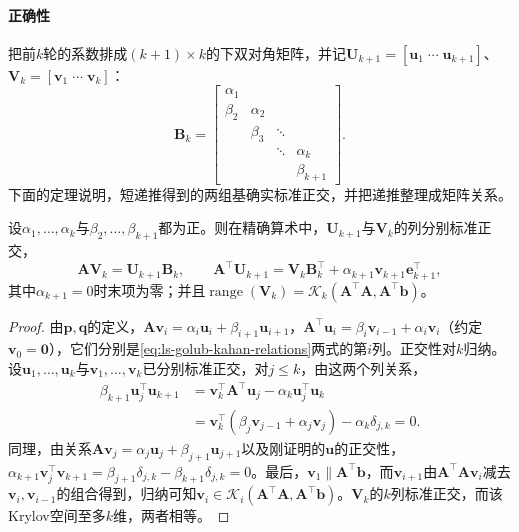 \paragraph{正确性}
把前$k$轮的系数排成$(k+1)\times k$的下双对角矩阵，并记$\bm U_{k+1}=[\bm u_1\;\cdots\;\bm u_{k+1}]$、$\bm V_k=[\bm v_1\;\cdots\;\bm v_k]$：
\[
 \bm B_k=
 \begin{bmatrix}
 \alpha_1&&&\\
 \beta_2&\alpha_2&&\\
 &\beta_3&\ddots&\\
 &&\ddots&\alpha_k\\
 &&&\beta_{k+1}
 \end{bmatrix}.
\]
下面的定理说明，短递推得到的两组基确实标准正交，并把递推整理成矩阵关系。

\begin{theorem}
\label{thm:ls-golub-kahan-relations}
设$\alpha_1,\ldots,\alpha_k$与$\beta_2,\ldots,\beta_{k+1}$都为正。则在精确算术中，$\bm U_{k+1}$与$\bm V_k$的列分别标准正交，
\begin{equation}
 \bm A\bm V_k=\bm U_{k+1}\bm B_k,\qquad
 \bm A^\top\bm U_{k+1}=\bm V_k\bm B_k^\top+\alpha_{k+1}\bm v_{k+1}\bm e_{k+1}^\top,
 \label{eq:ls-golub-kahan-relations}
\end{equation}
其中$\alpha_{k+1}=0$时末项为零；并且$\operatorname{range}(\bm V_k)=\mathcal K_k(\bm A^\top\bm A,\bm A^\top\bm b)$。
\end{theorem}

\begin{proof}
由$\bm p,\bm q$的定义，$\bm A\bm v_i=\alpha_i\bm u_i+\beta_{i+1}\bm u_{i+1}$，$\bm A^\top\bm u_i=\beta_i\bm v_{i-1}+\alpha_i\bm v_i$（约定$\bm v_0=\bm0$），它们分别是\eqref{eq:ls-golub-kahan-relations}两式的第$i$列。正交性对$k$归纳。设$\bm u_1,\ldots,\bm u_k$与$\bm v_1,\ldots,\bm v_k$已分别标准正交，对$j\le k$，由这两个列关系，
\[
 \begin{aligned}
 \beta_{k+1}\bm u_j^\top\bm u_{k+1}
 &=\bm v_k^\top\bm A^\top\bm u_j-\alpha_k\bm u_j^\top\bm u_k\\
 &=\bm v_k^\top(\beta_j\bm v_{j-1}+\alpha_j\bm v_j)-\alpha_k\delta_{j,k}=0 .
 \end{aligned}
\]
同理，由关系$\bm A\bm v_j=\alpha_j\bm u_j+\beta_{j+1}\bm u_{j+1}$以及刚证明的$\bm u$的正交性，$\alpha_{k+1}\bm v_j^\top\bm v_{k+1}=\beta_{j+1}\delta_{j,k}-\beta_{k+1}\delta_{j,k}=0$。最后，$\bm v_1\parallel\bm A^\top\bm b$，而$\bm v_{i+1}$由$\bm A^\top\bm A\bm v_i$减去$\bm v_i,\bm v_{i-1}$的组合得到，归纳可知$\bm v_i\in\mathcal K_i(\bm A^\top\bm A,\bm A^\top\bm b)$。$\bm V_k$的$k$列标准正交，而该Krylov空间至多$k$维，两者相等。
\end{proof}

